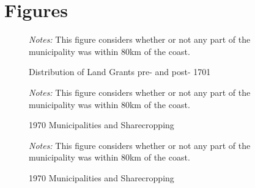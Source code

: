 \documentclass{article}
\begin{document}
\clearpage



\printbibliography

\clearpage

\section{Figures}

\begin{figure}
  \caption{Distribution of Land Grants pre- and post- 1701}
  \begin{center}
  \textit{Notes:} This figure considers whether or not any part of the municipality was within 80km of the coast.
  \end{center}
  \label{fig:SesmariasDistribution}
\end{figure}


\clearpage

\begin{figure}[h!]
  \caption{1970 Municipalities and Sharecropping}
  \begin{center}
  \textit{Notes:} This figure considers whether or not any part of the municipality was within 80km of the coast.
  \end{center}
  \label{fig:pasture_grid}
\end{figure}

\begin{figure}
  \caption{1970 Municipalities and Sharecropping}
  \begin{center}
  \textit{Notes:} This figure considers whether or not any part of the municipality was within 80km of the coast.
  \end{center}
  \label{fig:natural_grid}
\end{figure}
\end{document}
